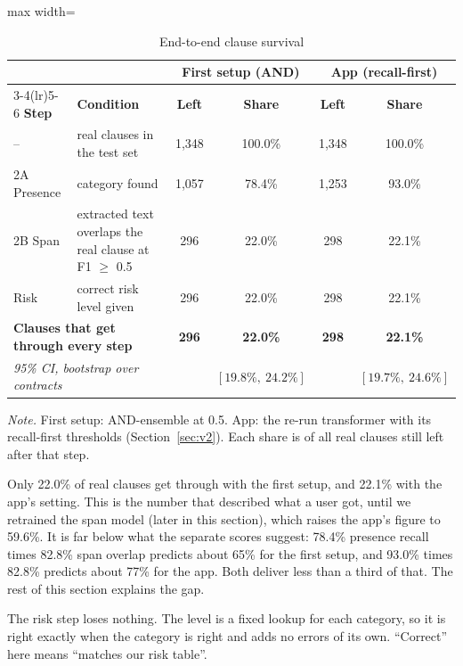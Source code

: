 \begin{table}[!htbp]
\centering
\caption{End-to-end clause survival}
\label{tab:e2e}
\small
\begin{adjustbox}{max width=\textwidth}
\begin{tabular}{llcccc}
\toprule
 & & \multicolumn{2}{c}{\textbf{First setup (AND)}} & \multicolumn{2}{c}{\textbf{App (recall-first)}}\\
\cmidrule(lr){3-4}\cmidrule(lr){5-6}
\textbf{Step} & \textbf{Condition} & \textbf{Left} & \textbf{Share} & \textbf{Left} & \textbf{Share}\\
\midrule
 -- & real clauses in the test set & 1{,}348 & 100.0\% & 1{,}348 & 100.0\%\\
2A Presence & category found & 1{,}057 & 78.4\% & 1{,}253 & 93.0\%\\
2B Span & extracted text overlaps the real clause at F1 $\geq$ 0.5 & 296 & 22.0\% & 298 & 22.1\%\\
Risk & correct risk level given & 296 & 22.0\% & 298 & 22.1\%\\
\midrule
\multicolumn{2}{l}{\textbf{Clauses that get through every step}} & \textbf{296} & \textbf{22.0\%} & \textbf{298} & \textbf{22.1\%}\\
\multicolumn{2}{l}{\emph{95\% CI, bootstrap over contracts}} & & $[19.8\%,\ 24.2\%]$ & & $[19.7\%,\ 24.6\%]$\\
\bottomrule
\end{tabular}
\end{adjustbox}

{\footnotesize\singlespacing \emph{Note.} First setup: AND-ensemble at 0.5. App: the re-run transformer with its recall-first thresholds (Section~\ref{sec:v2}). Each share is of all real clauses still left after that step.\par}
\end{table}

Only 22.0\% of real clauses get through with the first setup, and 22.1\% with the app's setting. This is the number that described what a user got, until we retrained the span model (later in this section), which raises the app's figure to 59.6\%. It is far below what the separate scores suggest: 78.4\% presence recall times 82.8\% span overlap predicts about 65\% for the first setup, and 93.0\% times 82.8\% predicts about 77\% for the app. Both deliver less than a third of that. The rest of this section explains the gap.

The risk step loses nothing. The level is a fixed lookup for each category, so it is right exactly when the category is right and adds no errors of its own. ``Correct'' here means ``matches our risk table''.

